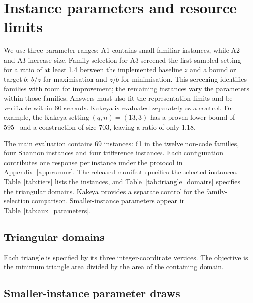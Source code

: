 \appendixpage
\section{Instance parameters and resource limits}
\label{app:tiers}
We use three parameter ranges: A1 contains small familiar instances, while A2 and A3 increase size. Family selection for A3 screened the first sampled setting for a ratio of at least 1.4 between the implemented baseline $z$ and a bound or target $b$: $b/z$ for maximisation and $z/b$ for minimisation. This screening identifies families with room for improvement; the remaining instances vary the parameters within those families. Answers must also fit the representation limits and be verifiable within 60 seconds. Kakeya is evaluated separately as a control. For example, the Kakeya setting $(q,n)=(13,3)$ has a proven lower bound of 595~\citep{bukh2021kakeya} and a construction of size 703, leaving a ratio of only 1.18.

The main evaluation contains 69 instances: 61 in the twelve non-code families, four Shannon instances and four trifference instances. Each configuration contributes one response per instance under the protocol in Appendix~\ref{app:runner}. The released manifest specifies the selected instances. Table~\ref{tab:tiers} lists the instances, and Table~\ref{tab:triangle_domains} specifies the triangular domains. Kakeya provides a separate control for the family-selection comparison. Smaller-instance parameters appear in Table~\ref{tab:aux_parameters}.
\small\setlength{\tabcolsep}{4pt}

\normalsize
\subsection{Triangular domains}
\small\normalsize
Each triangle is specified by its three integer-coordinate vertices. The objective is the minimum triangle area divided by the area of the containing domain.
\appendixpage
\subsection{Smaller-instance parameter draws}
\small\normalsize
